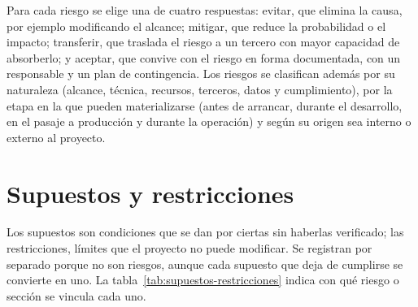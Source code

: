 Para cada riesgo se elige una de cuatro respuestas: evitar, que elimina la causa, por ejemplo modificando el alcance; mitigar, que reduce la probabilidad o el impacto; transferir, que traslada el riesgo a un tercero con mayor capacidad de absorberlo; y aceptar, que convive con el riesgo en forma documentada, con un responsable y un plan de contingencia. Los riesgos se clasifican además por su naturaleza (alcance, técnica, recursos, terceros, datos y cumplimiento), por la etapa en la que pueden materializarse (antes de arrancar, durante el desarrollo, en el pasaje a producción y durante la operación) y según su origen sea interno o externo al proyecto.

\section{Supuestos y restricciones}\label{sec:n6.2}

Los supuestos son condiciones que se dan por ciertas sin haberlas verificado; las restricciones, límites que el proyecto no puede modificar. Se registran por separado porque no son riesgos, aunque cada supuesto que deja de cumplirse se convierte en uno. La tabla~\ref{tab:supuestos-restricciones} indica con qué riesgo o sección se vincula cada uno.


